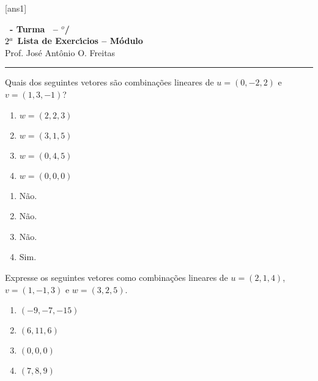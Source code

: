 \documentclass[12pt]{exam}
\begin{document}
  [ans1]
  \begin{center}
    {\Large\bf \disciplina\ - Turma \turma\ -- \semestre$^{o}$/\ano} \\ \vspace{9pt} {\large\bf
        $2^a$ Lista de Exerc{\'\i}cios -- Módulo \numeromodulo}\\ \vspace{9pt} Prof. Jos{\'e} Ant{\^o}nio O. Freitas
  \end{center}
  \hrule


\begin{exercicio}
    Quais dos seguintes vetores são combinações lineares de $u = (0, -2, 2)$ e $v = (1, 3, -1)$?
    \begin{multicols}{2}
        \begin{enumerate}[label={\alph*})]
            \item $w = (2, 2, 3)$

            \item $w = (3, 1, 5)$

            \item $w = (0, 4, 5)$

            \item $w = (0, 0, 0)$
        \end{enumerate}
    \end{multicols}
    \begin{solucao}
      \begin{multicols}{2}
        \begin{enumerate}[label={\alph*})]
          \item Não.

          \item Não.

          \item Não.

          \item Sim.
        \end{enumerate}
      \end{multicols}
    \end{solucao}
\end{exercicio}

\begin{exercicio}
    Expresse os seguintes vetores como combinações lineares de $u = (2, 1, 4)$, $v = (1, -1, 3)$ e $w = (3, 2, 5)$.
    \begin{multicols}{2}
        \begin{enumerate}[label={\alph*})]
            \item $(-9, -7, -15)$

            \item $(6, 11, 6)$

            \item $(0, 0, 0)$

            \item $(7, 8, 9)$
        \end{enumerate}
    \end{multicols}
\end{exercicio}
\end{document}
